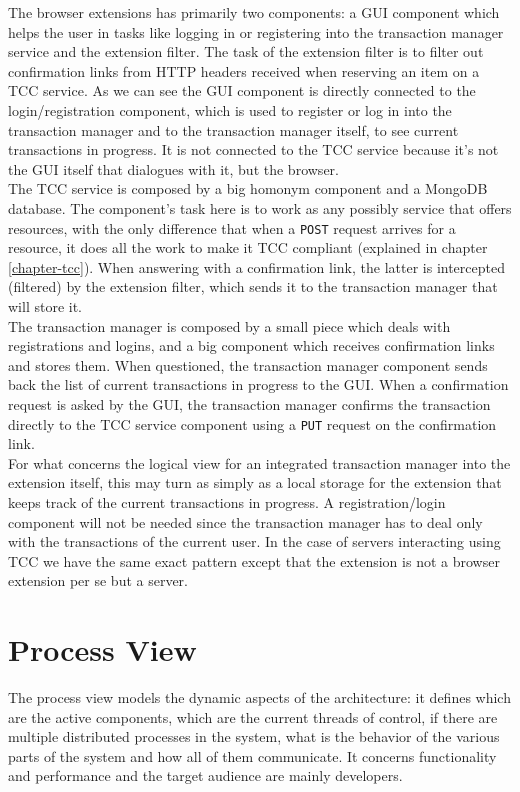 The browser extensions has primarily two components: a GUI component which helps the user in tasks like logging in or registering into the transaction manager service and the extension filter. The task of the extension filter is to filter out confirmation links from HTTP headers received when reserving an item on a TCC service. As we can see the GUI component is directly connected to the login/registration component, which is used to register or log in into the transaction manager and to the transaction manager itself, to see current transactions in progress. It is not connected to the TCC service because it's not the GUI itself that dialogues with it, but the browser.\\
The TCC service is composed by a big homonym component and a MongoDB database. The component's task here is to work as any possibly service that offers resources, with the only difference that when a {\tt POST} request arrives for a resource, it does all the work to make it TCC compliant (explained in chapter \ref{chapter-tcc}). When answering with a confirmation link, the latter is intercepted (filtered) by the extension filter, which sends it to the transaction manager that will store it.\\
The transaction manager is composed by a small piece which deals with registrations and logins, and a big component which receives confirmation links and stores them. When questioned, the transaction manager component sends back the list of current transactions in progress to the GUI. When a confirmation request is asked by the GUI, the transaction manager confirms the transaction directly to the TCC service component using a {\tt PUT} request on the confirmation link.\\
For what concerns the logical view for an integrated transaction manager into the extension itself, this may turn as simply as a local storage for the extension that keeps track of the current transactions in progress. A registration/login component will not be needed since the transaction manager has to deal only with the transactions of the current user. In the case of servers interacting using TCC we have the same exact pattern except that the extension is not a browser extension per se but a server.

\section{Process View}
The process view models the dynamic aspects of the architecture: it defines which are the active components, which are the current threads of control, if there are multiple distributed processes in the system, what is the behavior of the various parts of the system and how all of them communicate. It concerns functionality and performance and the target audience are mainly developers.\\

